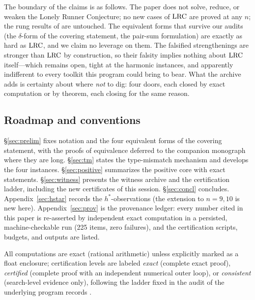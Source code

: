The boundary of the claims is as follows. The paper does not solve,
reduce, or weaken the Lonely Runner Conjecture; no new cases of $\mathrm{LRC}$
are proved at any $n$; the rung results of
\cite{Rosenfeld8,Trakulthongchai,Sungkawichai,Allikvere} are untouched.
The equivalent forms that survive our audits (the $\delta$-form of the
covering statement, the pair-sum formulation) are exactly as hard as
$\mathrm{LRC}$, and we claim no leverage on them. The falsified strengthenings
are stronger than $\mathrm{LRC}$ by construction, so their falsity implies
nothing about $\mathrm{LRC}$ itself---which remains open, tight at the harmonic
instances, and apparently indifferent to every toolkit this program could
bring to bear. What the archive adds is certainty about where \emph{not}
to dig: four doors, each closed by exact computation or by theorem, each
closing for the same reason.

\subsection{Roadmap and conventions}

\S\ref{sec:prelim} fixes notation and the four equivalent forms of the
covering statement, with the proofs of equivalence deferred to the
companion monograph where they are long. \S\ref{sec:tm} states the
type-mismatch mechanism and develops the four instances.
\S\ref{sec:positive} summarizes the positive core with exact statements.
\S\ref{sec:witness} presents the witness archive and the certification
ladder, including the new certificates of this session.
\S\ref{sec:concl} concludes. Appendix~\ref{sec:hstar} records the
$h^*$-observations (the extension to $n=9,10$ is new here).
Appendix~\ref{sec:prov} is the provenance ledger: every number cited in
this paper is re-asserted by independent exact computation in a
persisted, machine-checkable run (225 items, zero failures), and the
certification scripts, budgets, and outputs are listed.

All computations are exact (rational arithmetic) unless explicitly marked
as a float enclosure; certification levels are labeled \emph{exact}
(complete exact proof), \emph{certified} (complete proof with an
independent numerical outer loop), or \emph{consistent} (search-level
evidence only), following the ladder fixed in the audit of the underlying
program records \cite{prog-artifacts}.
